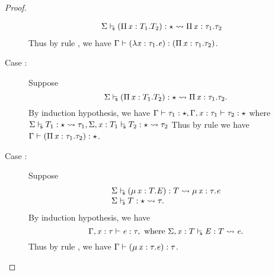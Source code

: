 \begin{proof}
\begin{description}
\[\begin{array}{ll}
             \Sigma  \vdash_{\!\!\mathsf{s} }  (  \Pi \, \mathit{x}  :  T_{{\mathrm{1}}}  .  T_{{\mathrm{2}}}  )  :  \star   \rightsquigarrow   \Pi \, \mathit{x}  :  \tau_{{\mathrm{1}}}  .  \tau_{{\mathrm{2}}}  &
            \end{array}
            \]
            Thus by rule , we have $\Gamma  \vdash  (  \lambda  \mathit{x}  :  \tau_{{\mathrm{1}}}  .  \mathit{e}  )  :  (  \Pi \, \mathit{x}  :  \tau_{{\mathrm{1}}}  .  \tau_{{\mathrm{2}}}  )$.
        \item[Case \ruleref{TR\_Pi}:] Suppose 
                \[  \Sigma  \vdash_{\!\!\mathsf{s} }  (  \Pi \, \mathit{x}  :  T_{{\mathrm{1}}}  .  T_{{\mathrm{2}}}  )  :  \star   \rightsquigarrow   \Pi \, \mathit{x}  :  \tau_{{\mathrm{1}}}  .  \tau_{{\mathrm{2}}} . \] 
            By induction hypothesis, we have 
            $
                \Gamma  \vdash  \tau_{{\mathrm{1}}}  :  \star, \Gamma  ,  \mathit{x}  :  \tau_{{\mathrm{1}}}  \vdash  \tau_{{\mathrm{2}}}  :  \star
            $
            where
            $
                 \Sigma  \vdash_{\!\!\mathsf{s} }  T_{{\mathrm{1}}}  :  \star   \rightsquigarrow   \tau_{{\mathrm{1}}} ,  \Sigma  ,  \mathit{x}  :  T_{{\mathrm{1}}}  \vdash_{\!\!\mathsf{s} }  T_{{\mathrm{2}}}  :  \star   \rightsquigarrow   \tau_{{\mathrm{2}}} 
            $
            Thus by rule  we have $\Gamma  \vdash  (  \Pi \, \mathit{x}  :  \tau_{{\mathrm{1}}}  .  \tau_{{\mathrm{2}}}  )  :  \star$.
        \item[Case \ruleref{TR\_Mu}:] Suppose 
                \[\begin{array}{l}
                     \Sigma  \vdash_{\!\!\mathsf{s} }  (  \mu \, \mathit{x}  :  T  .  \mathit{E}  )  :  T   \rightsquigarrow   \mu \, \mathit{x}  :  \tau  .  \mathit{e}  \\
                     \Sigma  \vdash_{\!\!\mathsf{s} }  T  :  \star   \rightsquigarrow   \tau . 
                \end{array}\]
            By induction hypothesis, we have 
                \[ \Gamma  ,  \mathit{x}  :  \tau  \vdash  \mathit{e}  :  \tau,\text{ where } \Sigma  ,  \mathit{x}  :  T  \vdash_{\!\!\mathsf{s} }  \mathit{E}  :  T   \rightsquigarrow   \mathit{e} . \] 
            Thus by rule , we have $\Gamma  \vdash  (  \mu \, \mathit{x}  :  \tau  .  \mathit{e}  )  :  \tau$.

\end{description}
\end{proof}
